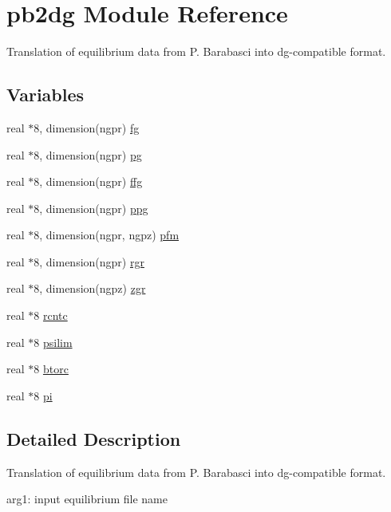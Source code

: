 \hypertarget{namespacepb2dg}{
\section{pb2dg Module Reference}
\label{namespacepb2dg}
}
Translation of equilibrium data from P. Barabasci into dg-compatible format.  


\subsection*{Variables}
\begin{CompactItemize}
\item 
real $\ast$8, dimension(ngpr) \hyperlink{namespacepb2dg_c4bcb2972129007ba170774e3c4cd6e1}{fg}
\item 
real $\ast$8, dimension(ngpr) \hyperlink{namespacepb2dg_11c0f57d1b6cf88b626a7303b39275b8}{pg}
\item 
real $\ast$8, dimension(ngpr) \hyperlink{namespacepb2dg_8877d818c19720f058d24c97e09aca0a}{ffg}
\item 
real $\ast$8, dimension(ngpr) \hyperlink{namespacepb2dg_759cca590c253be6ad4e8109bb854bc9}{ppg}
\item 
real $\ast$8, dimension(ngpr, ngpz) \hyperlink{namespacepb2dg_74ff9bdb9b47e6aa7d40970f2a1255db}{pfm}
\item 
real $\ast$8, dimension(ngpr) \hyperlink{namespacepb2dg_5018cdbf4ff81bb02ec25414689c7987}{rgr}
\item 
real $\ast$8, dimension(ngpz) \hyperlink{namespacepb2dg_1d7660eee49ff1cdeb8a990886b2bca6}{zgr}
\item 
real $\ast$8 \hyperlink{namespacepb2dg_6b53ad4b2024949719cfea4dd16feda1}{rcntc}
\item 
real $\ast$8 \hyperlink{namespacepb2dg_461caa2db520facf89776aa25ef06cae}{psilim}
\item 
real $\ast$8 \hyperlink{namespacepb2dg_bb98e426dd9cafc894a6572df354a934}{btorc}
\item 
real $\ast$8 \hyperlink{namespacepb2dg_afbfb864348af51164a5b5600c562bf3}{pi}
\end{CompactItemize}


\subsection{Detailed Description}
Translation of equilibrium data from P. Barabasci into dg-compatible format. 

arg1: input equilibrium file name

